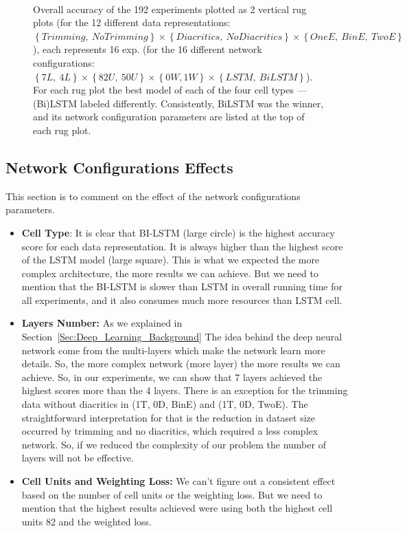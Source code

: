\begin{figure}[!t]
 
 \caption{Overall accuracy of the 192 experiments plotted as 2 vertical rug plots (for the 12 different data representations: $\left\{\mathit{Trimming},\ \mathit{No Trimming} \right\} \times \left\{\mathit{Diacritics},\ \mathit{No Diacritics} \right\} \times \left\{\mathit{OneE},\ \mathit{BinE},\ \mathit{TwoE}\right\}$), each represents 16 exp. (for the 16 different network configurations: $\left\{7L,\ 4L\right\} \times \left\{82U,\ 50U\right\} \times \left\{0W, 1W\right\} \times \left\{LSTM,\ BiLSTM\right\}$). For each rug plot the best model of each of the four cell types ---(Bi)LSTM labeled differently. Consistently, BiLSTM was the winner, and its network configuration parameters are listed at the top of each rug plot.}~\label{Fig:ArabicModelsResults}
\end{figure}



\subsection{Network Configurations Effects}

This section is to comment on the effect of the network configurations parameters.
\begin{itemize}
 \item \textbf{Cell Type}: It is clear that BI-LSTM (large circle) is the highest accuracy score for each data representation. It is always higher than the highest score of the LSTM model (large square). This is what we expected the more complex architecture, the more results we can achieve. But we need to mention that the BI-LSTM is slower than LSTM in overall running time for all experiments, and it also consumes much more resources than LSTM cell.
 \item \textbf{Layers Number:} As we explained in Section~\ref{Sec:Deep_Learning_Background} The idea behind the deep neural network come from the multi-layers which make the network learn more details. So, the more complex network (more layer) the more results we can achieve. So, in our experiments, we can show that 7 layers achieved the highest scores more than the 4 layers. There is an exception for the trimming data without diacritics in (1T, 0D, BinE) and (1T, 0D, TwoE). The straightforward interpretation for that is the reduction in dataset size occurred by trimming and no diacritics, which required a less complex network. So, if we reduced the complexity of our problem the number of layers will not be effective.

 \item \textbf{Cell Units and Weighting Loss:} We can't figure out a consistent effect based on the number of cell units or the weighting loss. But we need to mention that the highest results achieved were using both the highest cell units 82 and the weighted loss.
\end{itemize}



